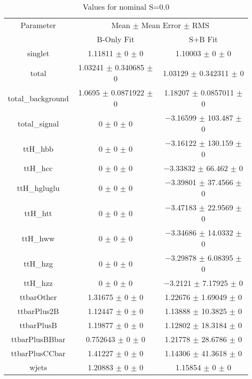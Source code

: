 \begin{table}
\centering
\caption{Values for nominal S=0.0}
\begin{tabular}{ccc}
\toprule
Parameter & \multicolumn{2}{c}{Mean $\pm$ Mean Error $\pm$ RMS}\\
 & B-Only Fit & S+B Fit\\
\midrule
singlet & \num{1.11811} $\pm$ \num{0} $\pm$ \num{0} & \num{1.10003} $\pm$ \num{0} $\pm$ \num{0}\\
total & \num{1.03241} $\pm$ \num{0.340685} $\pm$ \num{0} & \num{1.03129} $\pm$ \num{0.342311} $\pm$ \num{0}\\
total\_background & \num{1.0695} $\pm$ \num{0.0871922} $\pm$ \num{0} & \num{1.18207} $\pm$ \num{0.0857011} $\pm$ \num{0}\\
total\_signal & \num{0} $\pm$ \num{0} $\pm$ \num{0} & \num{-3.16599} $\pm$ \num{103.487} $\pm$ \num{0}\\
ttH\_hbb & \num{0} $\pm$ \num{0} $\pm$ \num{0} & \num{-3.16122} $\pm$ \num{130.159} $\pm$ \num{0}\\
ttH\_hcc & \num{0} $\pm$ \num{0} $\pm$ \num{0} & \num{-3.33832} $\pm$ \num{66.462} $\pm$ \num{0}\\
ttH\_hgluglu & \num{0} $\pm$ \num{0} $\pm$ \num{0} & \num{-3.39801} $\pm$ \num{37.4566} $\pm$ \num{0}\\
ttH\_htt & \num{0} $\pm$ \num{0} $\pm$ \num{0} & \num{-3.47183} $\pm$ \num{22.9569} $\pm$ \num{0}\\
ttH\_hww & \num{0} $\pm$ \num{0} $\pm$ \num{0} & \num{-3.34686} $\pm$ \num{14.0332} $\pm$ \num{0}\\
ttH\_hzg & \num{0} $\pm$ \num{0} $\pm$ \num{0} & \num{-3.29878} $\pm$ \num{6.08395} $\pm$ \num{0}\\
ttH\_hzz & \num{0} $\pm$ \num{0} $\pm$ \num{0} & \num{-3.2121} $\pm$ \num{7.17925} $\pm$ \num{0}\\
ttbarOther & \num{1.31675} $\pm$ \num{0} $\pm$ \num{0} & \num{1.22676} $\pm$ \num{1.69049} $\pm$ \num{0}\\
ttbarPlus2B & \num{1.12447} $\pm$ \num{0} $\pm$ \num{0} & \num{1.13888} $\pm$ \num{10.3825} $\pm$ \num{0}\\
ttbarPlusB & \num{1.19877} $\pm$ \num{0} $\pm$ \num{0} & \num{1.12802} $\pm$ \num{18.3184} $\pm$ \num{0}\\
ttbarPlusBBbar & \num{0.752643} $\pm$ \num{0} $\pm$ \num{0} & \num{1.21778} $\pm$ \num{28.6786} $\pm$ \num{0}\\
ttbarPlusCCbar & \num{1.41227} $\pm$ \num{0} $\pm$ \num{0} & \num{1.14306} $\pm$ \num{41.3618} $\pm$ \num{0}\\
wjets & \num{1.20883} $\pm$ \num{0} $\pm$ \num{0} & \num{1.15854} $\pm$ \num{0} $\pm$ \num{0}\\
\bottomrule
\end{tabular}
\end{table}